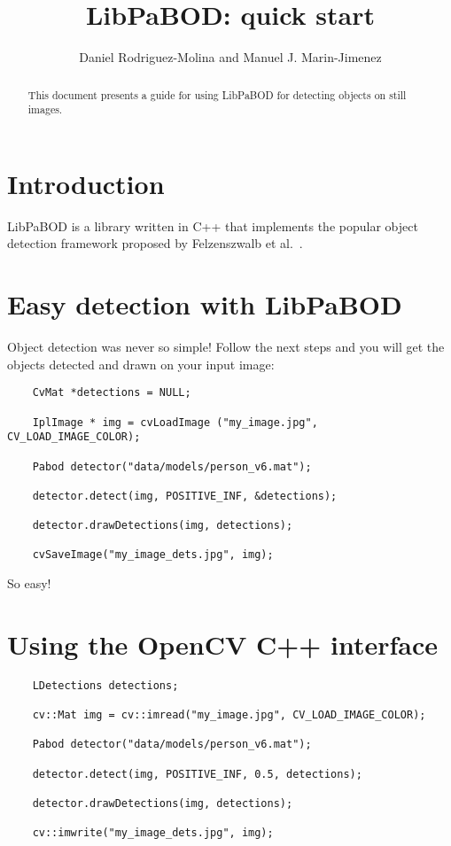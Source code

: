 


\title{LibPaBOD: quick start}
\author{Daniel Rodriguez-Molina and Manuel J. Marin-Jimenez}

\maketitle

\begin{abstract}
This document presents a guide for using LibPaBOD for detecting objects on still images.
\end{abstract}

\section{Introduction}
LibPaBOD is a library written in C++ that implements the popular object detection framework proposed by Felzenszwalb et al.~\cite{felzenszwalb2010}.

\section{Easy detection with LibPaBOD}

Object detection was never so simple! Follow the next steps and you will get the objects detected and drawn on your input image:

\begin{verbatim}
	CvMat *detections = NULL;

	IplImage * img = cvLoadImage ("my_image.jpg", CV_LOAD_IMAGE_COLOR);

	Pabod detector("data/models/person_v6.mat");
	
	detector.detect(img, POSITIVE_INF, &detections);
	
	detector.drawDetections(img, detections);

	cvSaveImage("my_image_dets.jpg", img);
\end{verbatim} 

\noindent So easy!

\section{Using the OpenCV C++ interface}

\begin{verbatim}
	LDetections detections;

	cv::Mat img = cv::imread("my_image.jpg", CV_LOAD_IMAGE_COLOR);

	Pabod detector("data/models/person_v6.mat");
	
	detector.detect(img, POSITIVE_INF, 0.5, detections);
	
	detector.drawDetections(img, detections);

	cv::imwrite("my_image_dets.jpg", img);
\end{verbatim} 


